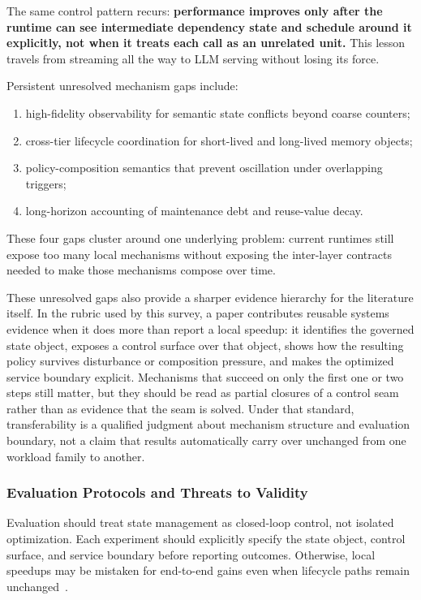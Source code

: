 \documentclass[acmsmall,screen,review]{acmart}
\newenvironment{quotebox}{%
  \vspace{4pt}\noindent
  \begin{lrbox}{\quoteboxcontent}
  \begin{minipage}{\dimexpr\linewidth-2\fboxsep-2\fboxrule-14pt\relax}
  \raggedright\small\itshape
  \hspace{6pt}%
}{%
  \end{minipage}
  \end{lrbox}
  \setlength{\fboxrule}{0.8pt}%
  \fcolorbox{quoteborder}{white}{\usebox{\quoteboxcontent}}%
  \vspace{4pt}%
}
\begin{document}
\begin{quotebox}
The same control pattern recurs: \textbf{performance improves only after the runtime can see intermediate dependency state and schedule around it explicitly, not when it treats each call as an unrelated unit.} This lesson travels from streaming all the way to LLM serving without losing its force.
\end{quotebox}
Persistent unresolved mechanism gaps include:
\begin{enumerate}[leftmargin=*]
\item high-fidelity observability for semantic state conflicts beyond coarse counters;
\item cross-tier lifecycle coordination for short-lived and long-lived memory objects;
\item policy-composition semantics that prevent oscillation under overlapping triggers;
\item long-horizon accounting of maintenance debt and reuse-value decay.
\end{enumerate}

These four gaps cluster around one underlying problem: current runtimes still expose too many local mechanisms without exposing the inter-layer contracts needed to make those mechanisms compose over time.

These unresolved gaps also provide a sharper evidence hierarchy for the literature itself. In the rubric used by this survey, a paper contributes reusable systems evidence when it does more than report a local speedup: it identifies the governed state object, exposes a control surface over that object, shows how the resulting policy survives disturbance or composition pressure, and makes the optimized service boundary explicit. Mechanisms that succeed on only the first one or two steps still matter, but they should be read as partial closures of a control seam rather than as evidence that the seam is solved. Under that standard, transferability is a qualified judgment about mechanism structure and evaluation boundary, not a claim that results automatically carry over unchanged from one workload family to another.

\subsubsection{Evaluation Protocols and Threats to Validity}

Evaluation should treat state management as closed-loop control, not isolated optimization. Each experiment should explicitly specify the state object, control surface, and service boundary before reporting outcomes. Otherwise, local speedups may be mistaken for end-to-end gains even when lifecycle paths remain unchanged~\cite{kwon2023pagedattention,agrawal2024sarathi,zheng2023sglang,mao2023morphstream}.
\end{document}

